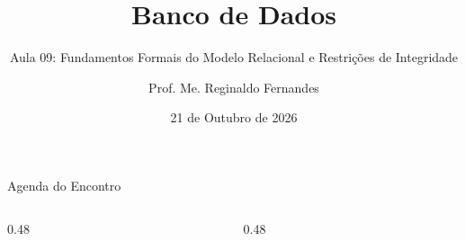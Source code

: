 \documentclass[aspectratio=169,utf8,t]{beamer}
\author{Prof. Me. Reginaldo Fernandes}
\institute{Instituto Federal do Ceará -- Campus Tauá \\ Tecnologia em Telemática}
\title{Banco de Dados}
\subtitle{Aula 09: Fundamentos Formais do Modelo Relacional e Restrições de Integridade}
\date{21 de Outubro de 2026}
\begin{document}
\frame[plain]{\titlepage}

\begin{frame}{Agenda do Encontro}
  \begin{columns}[t]
    \begin{column}{0.48\textwidth}
      \scriptsize
      \tableofcontents[sections={1-5}]
    \end{column}
    \begin{column}{0.48\textwidth}
      \scriptsize
      \tableofcontents[sections={6-9}]
    \end{column}
  \end{columns}
\end{frame}










\end{document}
